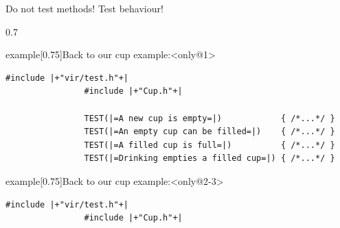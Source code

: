 \begin{frame}[fragile]{Do not test methods! Test behaviour!}
    \vspace{-11mm}
    \begin{overlayarea}{\textwidth}{0.7\textheight}
        \begin{varblock}{example}[0.75\textwidth]{Back to our cup example:}<only@1>
            \begin{lstlisting}[style=MyCpp]
                #include |+"vir/test.h"+|
                #include |+"Cup.h"+|

                TEST(|=A new cup is empty=|)            { /*...*/ }
                TEST(|=An empty cup can be filled=|)    { /*...*/ }
                TEST(|=A filled cup is full=|)          { /*...*/ }
                TEST(|=Drinking empties a filled cup=|) { /*...*/ }
            \end{lstlisting}
        \end{varblock}
        \begin{varblock}{example}[0.75\textwidth]{Back to our cup example:}<only@2-3>
            \begin{lstlisting}[style=MyCpp]
                #include |+"vir/test.h"+|
                #include |+"Cup.h"+|


\end{lstlisting}
\end{varblock}
\end{overlayarea}
\end{frame}
